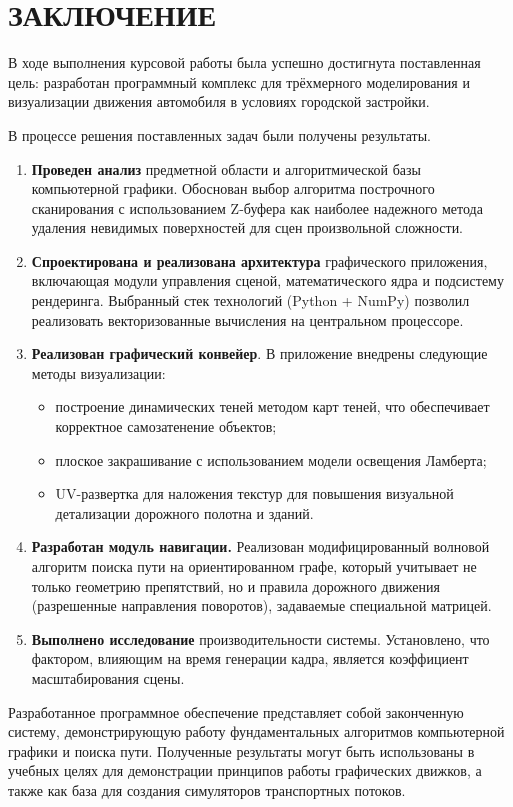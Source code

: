 \chapter*{ЗАКЛЮЧЕНИЕ}

В ходе выполнения курсовой работы была успешно достигнута поставленная цель: разработан программный комплекс для трёхмерного моделирования и визуализации движения автомобиля в условиях городской застройки.

В процессе решения поставленных задач были получены результаты.

\begin{enumerate}
	\item \textbf{Проведен анализ} предметной области и алгоритмической базы компьютерной графики. Обоснован выбор алгоритма построчного сканирования с использованием Z-буфера как наиболее надежного метода удаления невидимых поверхностей для сцен произвольной сложности.
	
	\item \textbf{Спроектирована и реализована архитектура} графического приложения, включающая модули управления сценой, математического ядра и подсистему рендеринга. Выбранный стек технологий (Python + NumPy) позволил реализовать векторизованные вычисления на центральном процессоре.
	
	\item \textbf{Реализован графический конвейер}. В приложение внедрены следующие методы визуализации:
	\begin{itemize}
		\item построение динамических теней методом карт теней, что обеспечивает корректное самозатенение объектов;
		\item плоское закрашивание с использованием модели освещения Ламберта;
		\item UV-развертка для наложения текстур для повышения визуальной детализации дорожного полотна и зданий.
	\end{itemize}
	
	\item \textbf{Разработан модуль навигации.} Реализован модифицированный волновой алгоритм поиска пути на ориентированном графе, который учитывает не только геометрию препятствий, но и правила дорожного движения (разрешенные направления поворотов), задаваемые специальной матрицей.
	
	\item \textbf{Выполнено исследование} производительности системы. Установлено, что фактором, влияющим на время генерации кадра, является коэффициент масштабирования сцены.
\end{enumerate}

Разработанное программное обеспечение представляет собой законченную систему, демонстрирующую работу фундаментальных алгоритмов компьютерной графики и поиска пути. Полученные результаты могут быть использованы в учебных целях для демонстрации принципов работы графических движков, а также как база для создания симуляторов транспортных потоков.